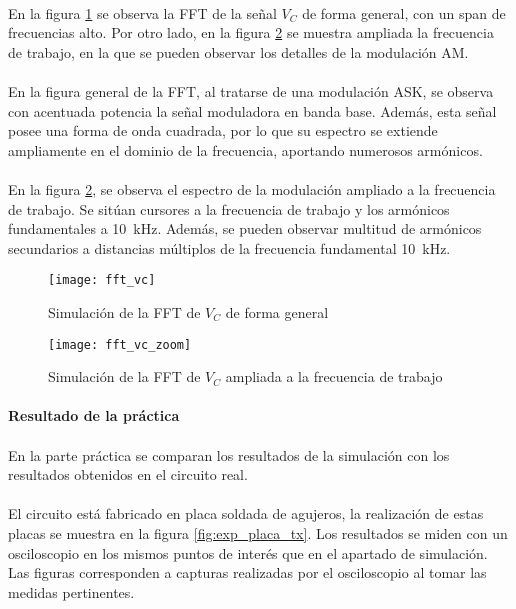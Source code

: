 \paragraph{}
En la figura \ref{fig:sim_fft} se observa la FFT de la señal $V_C$ de forma general, con un span de frecuencias alto. Por otro lado, en la figura \ref{fig:sim_fft_zoom} se muestra ampliada la frecuencia de trabajo, en la que se pueden observar los detalles de la modulación AM.
\paragraph{}
En la figura general de la FFT, al tratarse de una modulación ASK, se observa con acentuada potencia la señal moduladora en banda base. Además, esta señal posee una forma de onda cuadrada, por lo que su espectro se extiende ampliamente en el dominio de la frecuencia, aportando numerosos armónicos.
\paragraph{}
En la figura \ref{fig:sim_fft_zoom}, se observa el espectro de la modulación ampliado a la frecuencia de trabajo. Se sitúan cursores a la frecuencia de trabajo y los armónicos fundamentales a \SI{10}{\kilo\hertz}. Además, se pueden observar multitud de armónicos secundarios a distancias múltiplos de la frecuencia fundamental \SI{10}{\kilo\hertz}.
\begin{figure}[h!]
    \centering
    \texttt{[image: fft\_vc]}
    \caption{Simulaci\'on de la FFT de $V_C$ de forma general}
    \label{fig:sim_fft}
\end{figure}
\begin{figure}[h!]
    \centering
    \texttt{[image: fft\_vc\_zoom]}
    \caption{Simulaci\'on de la FFT de $V_C$ ampliada a la frecuencia de trabajo}
    \label{fig:sim_fft_zoom}
\end{figure}

\paragraph{Resultado de la pr\'actica} %
\paragraph{}
En la parte práctica se comparan los resultados de la simulación con los resultados obtenidos en el circuito real. 
\paragraph{}
El circuito está fabricado en placa soldada de agujeros, la realizaci\'on de estas placas se muestra en la figura \ref{fig:exp_placa_tx}. Los resultados se miden con un osciloscopio en los mismos puntos de interés que en el apartado de simulación. Las figuras corresponden a capturas realizadas por el osciloscopio al tomar las medidas pertinentes.

